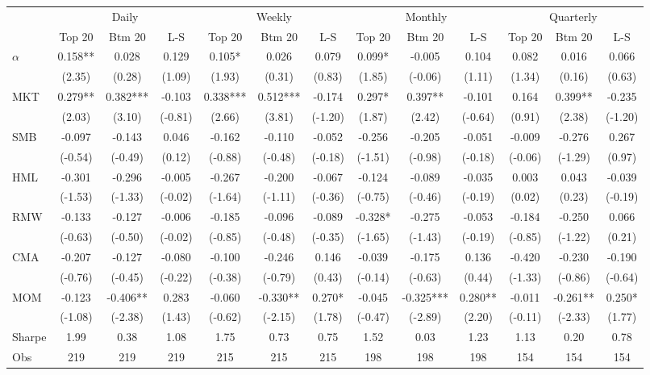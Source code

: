 \begin{tabular}{l*{12}{c}}
\toprule
 & \multicolumn{3}{c}{Daily} & \multicolumn{3}{c}{Weekly} & \multicolumn{3}{c}{Monthly} & \multicolumn{3}{c}{Quarterly} \\
\cmidrule(lr){2-4}\cmidrule(lr){5-7}\cmidrule(lr){8-10}\cmidrule(lr){11-13}
 & Top 20 & Btm 20 & L-S & Top 20 & Btm 20 & L-S & Top 20 & Btm 20 & L-S & Top 20 & Btm 20 & L-S \\
\midrule
$\alpha$ & 0.158** & 0.028 & 0.129 & 0.105* & 0.026 & 0.079 & 0.099* & -0.005 & 0.104 & 0.082 & 0.016 & 0.066 \\
 & (2.35) & (0.28) & (1.09) & (1.93) & (0.31) & (0.83) & (1.85) & (-0.06) & (1.11) & (1.34) & (0.16) & (0.63) \\
MKT & 0.279** & 0.382*** & -0.103 & 0.338*** & 0.512*** & -0.174 & 0.297* & 0.397** & -0.101 & 0.164 & 0.399** & -0.235 \\
 & (2.03) & (3.10) & (-0.81) & (2.66) & (3.81) & (-1.20) & (1.87) & (2.42) & (-0.64) & (0.91) & (2.38) & (-1.20) \\
SMB & -0.097 & -0.143 & 0.046 & -0.162 & -0.110 & -0.052 & -0.256 & -0.205 & -0.051 & -0.009 & -0.276 & 0.267 \\
 & (-0.54) & (-0.49) & (0.12) & (-0.88) & (-0.48) & (-0.18) & (-1.51) & (-0.98) & (-0.18) & (-0.06) & (-1.29) & (0.97) \\
HML & -0.301 & -0.296 & -0.005 & -0.267 & -0.200 & -0.067 & -0.124 & -0.089 & -0.035 & 0.003 & 0.043 & -0.039 \\
 & (-1.53) & (-1.33) & (-0.02) & (-1.64) & (-1.11) & (-0.36) & (-0.75) & (-0.46) & (-0.19) & (0.02) & (0.23) & (-0.19) \\
RMW & -0.133 & -0.127 & -0.006 & -0.185 & -0.096 & -0.089 & -0.328* & -0.275 & -0.053 & -0.184 & -0.250 & 0.066 \\
 & (-0.63) & (-0.50) & (-0.02) & (-0.85) & (-0.48) & (-0.35) & (-1.65) & (-1.43) & (-0.19) & (-0.85) & (-1.22) & (0.21) \\
CMA & -0.207 & -0.127 & -0.080 & -0.100 & -0.246 & 0.146 & -0.039 & -0.175 & 0.136 & -0.420 & -0.230 & -0.190 \\
 & (-0.76) & (-0.45) & (-0.22) & (-0.38) & (-0.79) & (0.43) & (-0.14) & (-0.63) & (0.44) & (-1.33) & (-0.86) & (-0.64) \\
MOM & -0.123 & -0.406** & 0.283 & -0.060 & -0.330** & 0.270* & -0.045 & -0.325*** & 0.280** & -0.011 & -0.261** & 0.250* \\
 & (-1.08) & (-2.38) & (1.43) & (-0.62) & (-2.15) & (1.78) & (-0.47) & (-2.89) & (2.20) & (-0.11) & (-2.33) & (1.77) \\
Sharpe & 1.99 & 0.38 & 1.08 & 1.75 & 0.73 & 0.75 & 1.52 & 0.03 & 1.23 & 1.13 & 0.20 & 0.78 \\
Obs & 219 & 219 & 219 & 215 & 215 & 215 & 198 & 198 & 198 & 154 & 154 & 154 \\
\bottomrule
\end{tabular}